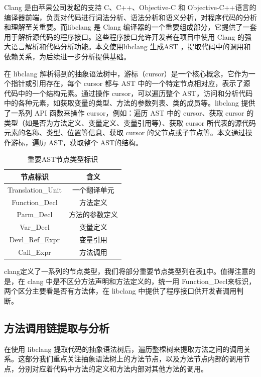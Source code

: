 Clang 是由苹果公司发起的支持 C、C++、Objective-C 和 Objective-C++语言的编译器前端，负责对代码进行词法分析、语法分析和语义分析，对程序代码的分析和理解至关重要\cite{clang}。而libclang 是 Clang 编译器的一个重要组成部分，它提供了一套用于解析源代码的程序接口。这些程序接口允许开发者在项目中使用 Clang 的强大语言解析和代码分析功能\cite{libclang}。本文使用libclang 生成AST ，提取代码中的调用和依赖关系，为后续进一步分析提供基础。

在 libclang 解析得到的抽象语法树中，游标（cursor）是一个核心概念，它作为一个指针或引用存在，每个 cursor 都与 AST 中的一个特定节点相对应，表示了源代码中的一个结构元素。通过操作 cursor，可以遍历整个 AST，访问和分析代码中的各种元素，如获取变量的类型、方法的参数列表、类的成员等。libclang 提供了一系列 API 函数来操作 cursor，例如：遍历 AST 中的 cursor、获取 cursor 的类型（如是否为方法定义、变量定义、变量引用等）、获取 cursor 所代表的源代码元素的名称、类型、位置等信息、获取 cursor 的父节点或子节点等。本文通过操作游标，遍历 AST，获取整个 AST的结构。

\begin{table}[htbp]
\caption{重要AST节点类型标识}
\label{1_重要AST节点类型标识}
\vspace{0.5em}\centering\wuhao
\begin{tabular}{cc}
\toprule
节点标识 & 含义  \\
\midrule
Translation\_Unit & 一个翻译单元 \\
Function\_Decl  & 方法定义 \\
Parm\_Decl & 方法的参数定义 \\
Var\_Decl & 变量定义 \\ 
Devl\_Ref\_Expr  & 变量引用  \\
Call\_Expr  & 方法调用  \\
\bottomrule
\end{tabular}
\end{table}   

clang定义了一系列的节点类型，我们将部分重要节点类型列在表\ref{1_重要AST节点类型标识}中。值得注意的是，在 clang 中是不区分方法声明和方法定义的，统一用 Function\_Decl来标识，两个区分主要看是否有方法体，在 libclang 中提供了程序接口供开发者调用判断。

\subsection{方法调用链提取与分析}
在使用 libclang 提取代码的抽象语法树后，遍历整棵树来提取方法之间的调用关系。这部分我们重点关注抽象语法树上的方法节点，以及方法节点内部的调用节点，分别对应着代码中方法的定义和方法内部对其他方法的调用。


